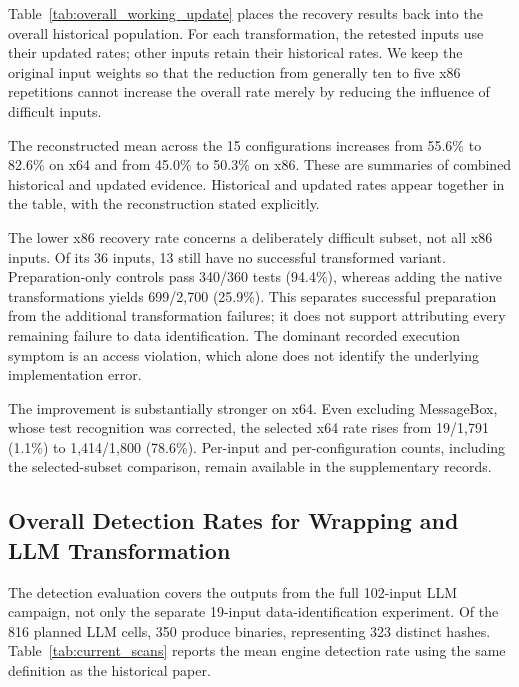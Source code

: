 Table~\ref{tab:overall_working_update} places the recovery results back
into the overall historical population. For each transformation, the
retested inputs use their updated rates; other inputs retain their
historical rates. We keep the original input weights so that the reduction
from generally ten to five x86 repetitions cannot increase the overall
rate merely by reducing the influence of difficult inputs.

The reconstructed mean across the 15 configurations increases from
55.6\% to 82.6\% on x64 and from 45.0\% to 50.3\% on x86.
These are summaries of combined historical and updated evidence. Historical and updated rates appear together in the table, with the
reconstruction stated explicitly.



The lower x86 recovery rate concerns a deliberately difficult subset,
not all x86 inputs. Of its 36 inputs, 13 still have no successful
transformed variant. Preparation-only controls pass 340/360 tests (94.4\%),
whereas adding the native transformations yields 699/2,700 (25.9\%).
This separates successful preparation from the additional transformation
failures; it does not support attributing every remaining failure to data
identification. The dominant recorded execution symptom is an access
violation, which alone does not identify the underlying implementation error.

The improvement is substantially stronger on x64. Even excluding
MessageBox, whose test recognition was corrected, the selected x64 rate
rises from 19/1,791 (1.1\%) to 1,414/1,800 (78.6\%). Per-input and
per-configuration counts, including the selected-subset comparison, remain
available in the supplementary records.

\subsection{Overall Detection Rates for Wrapping and LLM Transformation}
The detection evaluation covers the outputs from the full 102-input LLM
campaign, not only the separate 19-input data-identification experiment.
Of the 816 planned LLM cells, 350 produce binaries, representing 323
distinct hashes. Table~\ref{tab:current_scans} reports the mean engine
detection rate using the same definition as the historical paper.

